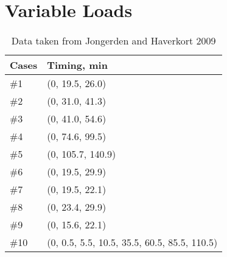 \chapter{Variable Loads}\label{appendix:VL}

\begin{table}[H]
\centering
\begin{tabular}{|l|l|}
\hline
Cases & Timing, min \\ \hline
\rowcolor[HTML]{EFEFEF} 
\#1 & (0, 19.5, 26.0) \\ \hline
\#2 & (0, 31.0, 41.3) \\ \hline
\rowcolor[HTML]{EFEFEF} 
\#3 & (0, 41.0, 54.6) \\ \hline
\#4 & (0, 74.6, 99.5) \\ \hline
\rowcolor[HTML]{EFEFEF} 
\#5 & (0, 105.7, 140.9) \\ \hline
\#6 & (0, 19.5, 29.9) \\ \hline
\rowcolor[HTML]{EFEFEF} 
\#7 & (0, 19.5, 22.1) \\ \hline
\#8 & (0, 23.4, 29.9) \\ \hline
\rowcolor[HTML]{EFEFEF} 
\#9 & (0, 15.6, 22.1) \\ \hline
\#10 & (0, 0.5, 5.5, 10.5, 35.5, 60.5, 85.5, 110.5) \\ \hline
\end{tabular}
\caption{Data taken from Jongerden and Haverkort 2009\cite{battery_model}}
\label{table:variable_loads_list}
\end{table}
